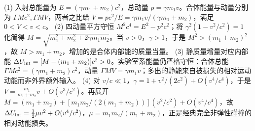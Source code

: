 (1) 入射总能量为 \(E=(\gamma m_1+m_2)c^2\)，总动量 \(p=\gamma m_1v\)。合体能量与动量分别为 \(\Gamma Mc^2,\Gamma MV\)，两者之比给 \(V=pc^2/E=\gamma m_1v/(\gamma m_1+m_2)\)，满足 \(0<V<v<c\)。
(2) 四动量平方守恒 \(M^2c^4=E^2-p^2c^2\)；将 \(\gamma^2(1-v^2/c^2)=1\) 化简得 \(M=\sqrt{m_1^2+m_2^2+2\gamma m_1m_2}\)。当 \(v>0\)，\(\gamma>1\)，于是 \(M^2>(m_1+m_2)^2\)，故 \(M>m_1+m_2\)，增加的是合体内部能的质量当量。
(3) 静质量增量对应内部能 \(\Delta U_{\rm int}=[M-(m_1+m_2)]c^2>0\)。实验室系能量仍严格守恒：合体总能 \(\Gamma Mc^2=(\gamma m_1+m_2)c^2\)，动量 \(\Gamma MV=\gamma m_1v\)；多出的静能来自被损失的相对运动动能而非外界额外输入。
(4) 对 \(v/c\ll1\)，\(\gamma=1+v^2/(2c^2)+O(v^4/c^4)\)，于是 \(V=\frac{m_1}{m_1+m_2}v+O(v^3/c^2)\)。再展开 \(M=(m_1+m_2)+[m_1m_2/(2(m_1+m_2))](v^2/c^2)+O(v^4/c^4)\)，故 \(\Delta U_{\rm int}=\frac12\mu v^2+O(v^4/c^2)\)，\(\mu=m_1m_2/(m_1+m_2)\)，正是经典完全非弹性碰撞的相对动能损失。

